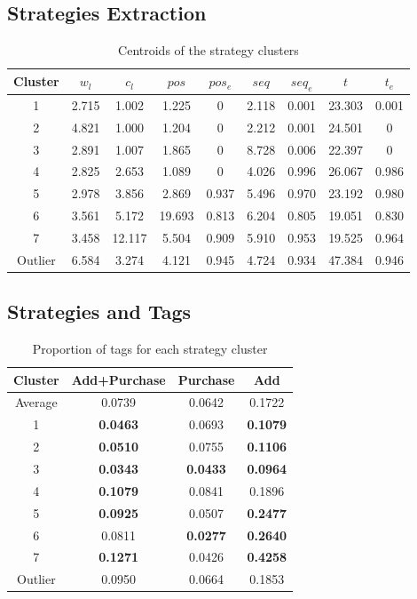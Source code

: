 \documentclass[sigconf,anonymous]{acmart}
\theoremstyle{definition}
\begin{document}
\subsection{Strategies Extraction}\label{sec:single:strategy}
\begin{table}[htbp]
\centering
\small
\caption{Centroids of the strategy clusters}\label{tab:centroids}
\vspace*{-5pt}
\begin{tabular}{|c|c|c|c|c|c|c|c|c|}
\hline
Cluster & $w_l$ & $c_l$ & $pos$ & $pos_e$ & $seq$ & $seq_e$ & $t$ & $t_e$\\\hline
1 & 2.715 & 1.002 & 1.225 & 0 & 2.118 & 0.001 & 23.303 & 0.001 \\\hline
2 & 4.821 & 1.000 & 1.204 & 0 & 2.212 & 0.001 & 24.501 & 0 \\\hline
3 & 2.891 & 1.007 & 1.865 & 0 & 8.728 & 0.006 & 22.397 & 0 \\\hline
4 & 2.825 & 2.653 & 1.089 & 0 & 4.026 & 0.996 & 26.067 & 0.986 \\\hline
5 & 2.978 & 3.856 & 2.869 & 0.937 & 5.496 & 0.970 & 23.192 & 0.980 \\\hline
6 & 3.561 & 5.172 & 19.693 & 0.813 & 6.204 & 0.805 & 19.051 & 0.830 \\\hline
7 & 3.458 & 12.117 & 5.504 & 0.909 & 5.910 & 0.953 & 19.525 & 0.964 \\\hline
Outlier & 6.584 & 3.274 & 4.121 & 0.945 & 4.724 & 0.934 & 47.384 & 0.946 \\\hline
\end{tabular}
\end{table}

\subsection{Strategies and Tags}\label{sec:single:result}
\begin{table}[htbp]
\centering
\small
\caption{Proportion of tags for each strategy cluster}\label{tab:tags}
\vspace*{-5pt}
\begin{tabular}{|c|c|c|c|}
\hline
Cluster & Add+Purchase & Purchase & Add\\\hline
Average & 0.0739 & 0.0642 & 0.1722 \\\hline 
1 & \textbf{0.0463} & 0.0693 & \textbf{0.1079} \\\hline
2 & \textbf{0.0510} & 0.0755 & \textbf{0.1106} \\\hline
3 & \textbf{0.0343} & \textbf{0.0433} & \textbf{0.0964} \\\hline
4 & \textbf{0.1079} & 0.0841 & 0.1896 \\\hline
5 & \textbf{0.0925} & 0.0507 & \textbf{0.2477} \\\hline
6 & 0.0811 & \textbf{0.0277} & \textbf{0.2640} \\\hline
7 & \textbf{0.1271} & 0.0426 & \textbf{0.4258}\\\hline
Outlier & 0.0950 & 0.0664 & 0.1853\\\hline
\end{tabular}
\end{table}
\end{document}
